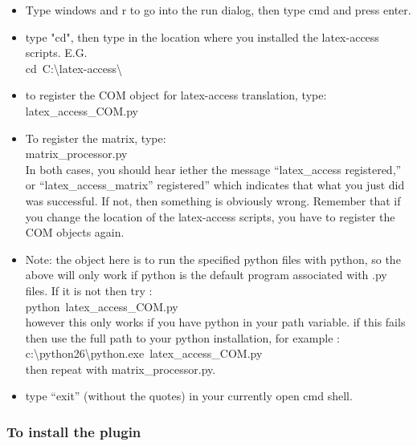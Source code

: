 \documentclass[12pt,a4paper]{report}
\begin{document}
\begin{itemize}
\item Type windows and r to go into the run dialog, then type cmd and press enter.
\item type "cd", then type in the location where you installed the latex-access scripts.  E.G.\\
\mbox{cd C:\textbackslash latex-access\textbackslash}
\item to register the COM object for latex-access translation, type:\\
\mbox{latex\_access\_COM.py}
\item To register the matrix, type:\\
\mbox{matrix\_processor.py}\\
  In both cases, you should hear iether the message ``latex\_access
  registered,'' or ``latex\_access\_matrix'' registered'' 
  which indicates that what you just did was successful.  If not,   then something is obviously wrong.  Remember that if you change the location of the latex-access scripts, you have to register the COM objects again.
\item Note: the object here is to run the specified python files with python, so the above will only work if python is the default program associated with .py files.  If it is not then try :\\
\mbox{python latex\_access\_COM.py}\\
however this only works if you have python in your path variable.  if this fails then use the full path to your python installation, for example :\\
\mbox{c:\textbackslash python26\textbackslash python.exe latex\_access\_COM.py}\\
then repeat with matrix\_processor.py.
\item type ``exit'' (without the quotes) in your currently open cmd shell.
\end{itemize}

\subsubsection{To install the plugin}
\end{document}
